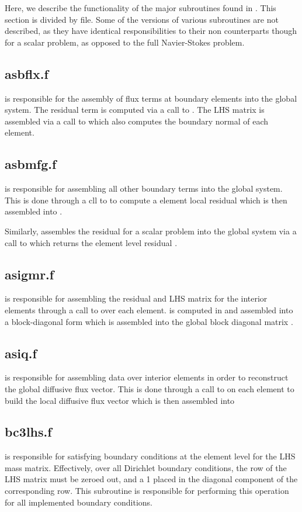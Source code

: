 \documentclass[./]{subfiles}
\begin{document}
Here, we describe the functionality of the major subroutines found in . This section is divided by file. Some of the  versions of various subroutines are not described, as they have identical responsibilities to their non  counterparts though for a scalar problem, as opposed to the full Navier-Stokes problem.
\subsection{asbflx.f}
 is responsible for the assembly of flux terms at boundary elements into the global system. The residual term is computed via a call to . The LHS matrix is assembled via a call to  which also computes the boundary normal of each element.

\subsection{asbmfg.f}
 is responsible for assembling all other boundary terms into the global system. This is done through a cll to  to compute a element local residual  which is then assembled into .

Similarly,  assembles the residual for a scalar problem into the global system via a call to  which returns the element level residual .

\subsection{asigmr.f}
 is responsible for assembling the residual and LHS matrix for the interior elements through a call to  over each element.  is computed in  and assembled into a block-diagonal form  which is assembled into the global block diagonal matrix .

\subsection{asiq.f}
 is responsible for assembling data over interior elements in order to reconstruct the global diffusive flux vector. This is done through a call to  on each element to build the local diffusive flux vector  which is then assembled into 

\subsection{bc3lhs.f}
 is responsible for satisfying boundary conditions at the element level for the LHS mass matrix. Effectively, over all Dirichlet boundary conditions, the row of the LHS matrix must be zeroed out, and a 1 placed in the diagonal component of the corresponding row. This subroutine is responsible for performing this operation for all implemented boundary conditions.
\end{document}
